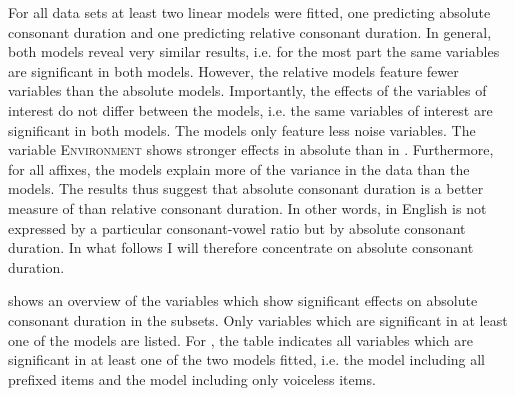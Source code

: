 For all data sets at least two linear models were fitted, one predicting absolute consonant duration and one predicting relative consonant duration. 
In general, both models reveal very similar results, i.e. for the most part the same variables are significant in both models. However, the relative models feature fewer variables than the absolute models.  Importantly, the effects of the variables of interest do not differ between the models, i.e. the same variables of interest are significant in both models. The  models only feature less noise variables. 
The variable \textsc{Environment} shows stronger effects in absolute than in . 
Furthermore, for all affixes, the  models explain more of the variance in the data than the  models. 
The results thus suggest that absolute consonant duration is a better measure of  than relative consonant duration. In other words,  in English is not expressed by a particular consonant-vowel ratio but by absolute consonant duration. 
In what follows I will therefore concentrate on absolute consonant duration.


 shows an overview of the variables which show significant effects on absolute consonant duration in the subsets. Only variables which are significant in at least one of the  models are listed. For , the table indicates all variables which are significant in at least one of the two  models fitted, i.e. the model including all prefixed items and the model including only voiceless items.

